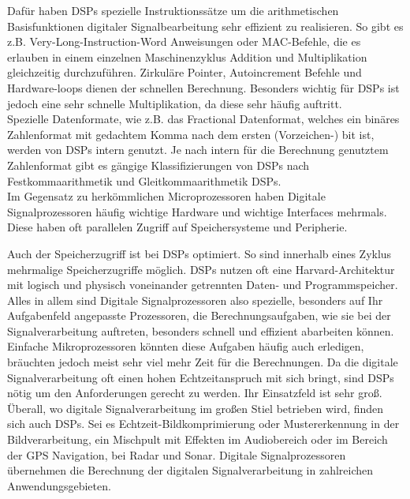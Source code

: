 \documentclass[a4paper,12pt,fontsize=12,DIV=12]{scrartcl}
\begin{document}
Dafür haben DSPs spezielle Instruktionssätze um die arithmetischen Basisfunktionen digitaler Signalbearbeitung sehr effizient zu realisieren. So gibt es z.B. Very-Long-Instruction-Word Anweisungen oder MAC-Befehle, die es erlauben in einem einzelnen Maschinenzyklus Addition und Multiplikation gleichzeitig durchzuführen. Zirkuläre Pointer, Autoincrement Befehle und Hardware-loops dienen der schnellen Berechnung. Besonders wichtig für DSPs ist jedoch eine sehr schnelle Multiplikation, da diese sehr häufig auftritt.
\\

Spezielle Datenformate, wie z.B. das Fractional Datenformat, welches ein binäres Zahlenformat mit gedachtem Komma nach dem ersten (Vorzeichen-) bit ist, werden von DSPs intern genutzt. Je nach intern für die Berechnung genutztem Zahlenformat gibt es gängige Klassifizierungen von DSPs nach Festkommaarithmetik und Gleitkommaarithmetik DSPs.
\\

Im Gegensatz zu herkömmlichen Microprozessoren haben Digitale Signalprozessoren häufig wichtige Hardware und wichtige Interfaces mehrmals. Diese haben oft parallelen Zugriff auf Speichersysteme und Peripherie.

Auch der Speicherzugriff ist bei DSPs optimiert. So sind innerhalb eines Zyklus mehrmalige Speicherzugriffe möglich.
DSPs nutzen oft eine Harvard-Architektur mit logisch und physisch voneinander getrennten Daten- und Programmspeicher. 
\\

Alles in allem sind Digitale Signalprozessoren also spezielle, besonders auf Ihr Aufgabenfeld angepasste Prozessoren, die Berechnungsaufgaben, wie sie bei der Signalverarbeitung auftreten, besonders schnell und effizient abarbeiten können. Einfache Mikroprozessoren könnten diese Aufgaben häufig auch erledigen, bräuchten jedoch meist sehr viel mehr Zeit für die Berechnungen.
Da die digitale Signalverarbeitung oft einen hohen Echtzeitanspruch mit sich bringt, sind DSPs nötig um den Anforderungen gerecht zu werden.
Ihr Einsatzfeld ist sehr groß. Überall, wo digitale Signalverarbeitung im großen Stiel betrieben wird, finden sich auch DSPs. Sei es Echtzeit-Bildkomprimierung oder Mustererkennung in der Bildverarbeitung, ein Mischpult mit Effekten im Audiobereich oder im Bereich der GPS Navigation, bei Radar und Sonar. Digitale Signalprozessoren übernehmen die Berechnung der digitalen Signalverarbeitung in zahlreichen Anwendungsgebieten.
\end{document}
